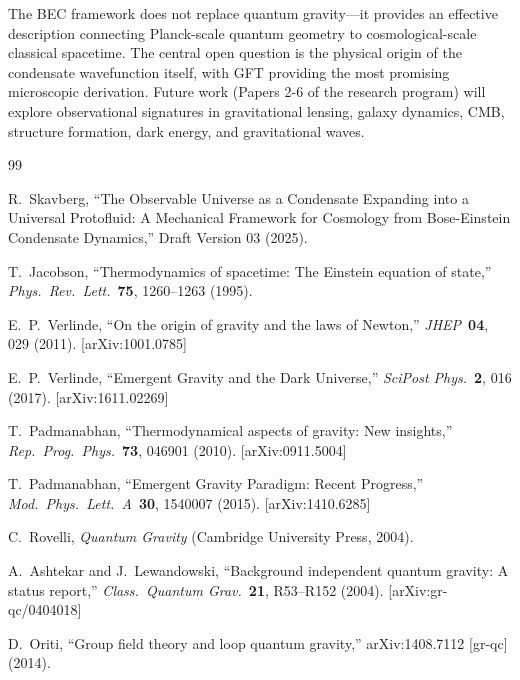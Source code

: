 \documentclass[11pt,a4paper]{article}
\theoremstyle{definition}
\theoremstyle{remark}
\begin{document}
The BEC framework does not replace quantum gravity---it provides an effective description connecting Planck-scale quantum geometry to cosmological-scale classical spacetime. The central open question is the physical origin of the condensate wavefunction itself, with GFT providing the most promising microscopic derivation. Future work (Papers 2-6 of the research program) will explore observational signatures in gravitational lensing, galaxy dynamics, CMB, structure formation, dark energy, and gravitational waves.


\begin{thebibliography}{99}

R.~Skavberg, ``The Observable Universe as a Condensate Expanding into a Universal Protofluid: A Mechanical Framework for Cosmology from Bose-Einstein Condensate Dynamics,'' Draft Version 03 (2025).

T.~Jacobson, ``Thermodynamics of spacetime: The Einstein equation of state,'' \emph{Phys.\ Rev.\ Lett.}\ \textbf{75}, 1260--1263 (1995).

E.~P.~Verlinde, ``On the origin of gravity and the laws of Newton,'' \emph{JHEP}\ \textbf{04}, 029 (2011). [arXiv:1001.0785]

E.~P.~Verlinde, ``Emergent Gravity and the Dark Universe,'' \emph{SciPost Phys.}\ \textbf{2}, 016 (2017). [arXiv:1611.02269]

T.~Padmanabhan, ``Thermodynamical aspects of gravity: New insights,'' \emph{Rep.\ Prog.\ Phys.}\ \textbf{73}, 046901 (2010). [arXiv:0911.5004]

T.~Padmanabhan, ``Emergent Gravity Paradigm: Recent Progress,'' \emph{Mod.\ Phys.\ Lett.\ A}\ \textbf{30}, 1540007 (2015). [arXiv:1410.6285]

C.~Rovelli, \emph{Quantum Gravity} (Cambridge University Press, 2004).

A.~Ashtekar and J.~Lewandowski, ``Background independent quantum gravity: A status report,'' \emph{Class.\ Quantum Grav.}\ \textbf{21}, R53--R152 (2004). [arXiv:gr-qc/0404018]

D.~Oriti, ``Group field theory and loop quantum gravity,'' arXiv:1408.7112 [gr-qc] (2014).


\end{thebibliography}
\end{document}
